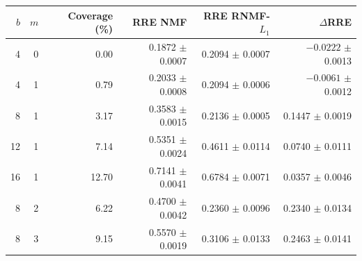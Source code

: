 \begin{tabular}{rrrrrr}
\toprule
$b$ & $m$ & Coverage (\%) & RRE NMF & RRE RNMF-$L_1$ & $\Delta$RRE \\
\midrule
4  & 0 & 0.00  & 0.1872 $\pm$ 0.0007 & 0.2094 $\pm$ 0.0007 & $-0.0222$ $\pm$ 0.0013 \\
4  & 1 & 0.79  & 0.2033 $\pm$ 0.0008 & 0.2094 $\pm$ 0.0006 & $-0.0061$ $\pm$ 0.0012 \\
8  & 1 & 3.17  & 0.3583 $\pm$ 0.0015 & 0.2136 $\pm$ 0.0005 & 0.1447 $\pm$ 0.0019 \\
12 & 1 & 7.14  & 0.5351 $\pm$ 0.0024 & 0.4611 $\pm$ 0.0114 & 0.0740 $\pm$ 0.0111 \\
16 & 1 & 12.70 & 0.7141 $\pm$ 0.0041 & 0.6784 $\pm$ 0.0071 & 0.0357 $\pm$ 0.0046 \\
8  & 2 & 6.22  & 0.4700 $\pm$ 0.0042 & 0.2360 $\pm$ 0.0096 & 0.2340 $\pm$ 0.0134 \\
8  & 3 & 9.15  & 0.5570 $\pm$ 0.0019 & 0.3106 $\pm$ 0.0133 & 0.2463 $\pm$ 0.0141 \\
\bottomrule
\end{tabular}
